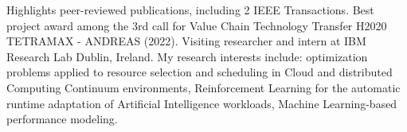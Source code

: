 \begin{rubric}{Highlights}
     peer-reviewed publications, including 2 IEEE Transactions.
    \entry*[] Best project award among the 3rd call for Value Chain Technology Transfer H2020 TETRAMAX - ANDREAS (2022).
    \entry*[] Visiting researcher and intern at IBM Research Lab Dublin, Ireland.
    \entry*[] My research interests include: optimization problems applied to resource selection and scheduling in Cloud and distributed Computing Continuum environments, Reinforcement Learning for the automatic runtime adaptation of Artificial Intelligence workloads, Machine Learning-based performance modeling.
\end{rubric}

